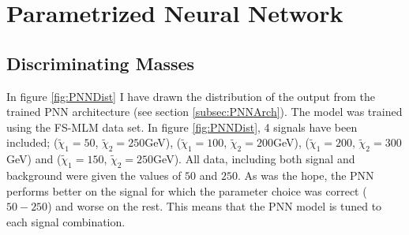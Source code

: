 \section{Parametrized Neural Network}
\subsection{Discriminating Masses}
In figure \ref{fig:PNNDist} I have drawn the distribution of the output from the trained \ac{PNN} architecture 
(see section \ref{subsec:PNNArch}). The model was trained using the FS-MLM data set. In figure \ref{fig:PNNDist},
4 signals have been included; ($\tilde{\chi}_1=50$, $\tilde{\chi}_2=250$GeV), ($\tilde{\chi}_1=100$, $\tilde{\chi}_2=200$GeV), 
($\tilde{\chi}_1=200$, $\tilde{\chi}_2=300$GeV) and ($\tilde{\chi}_1=150$, $\tilde{\chi}_2=250$GeV). All data, including 
both signal and background were given the values of $50$ and $250$. As was the hope, the \ac{PNN} performs better on 
the signal for which the parameter choice was correct ($50-250$) and worse on the rest. This means
that the \ac{PNN} model is tuned to each signal combination.
